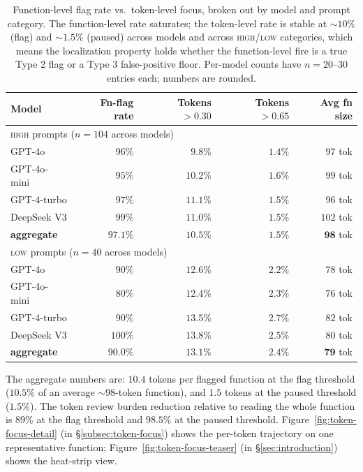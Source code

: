 \begin{table}[h]
\centering
\small
\begin{tabular}{l r r r r}
\toprule
\textbf{Model} & \textbf{Fn-flag rate} & \textbf{Tokens $>0.30$}
 & \textbf{Tokens $>0.65$} & \textbf{Avg fn size} \\
\midrule
\multicolumn{5}{l}{\textsc{high} prompts ($n=104$ across models)} \\
\midrule
GPT-4o        & $96\%$ & $9.8\%$  & $1.4\%$ & $97$ tok \\
GPT-4o-mini   & $95\%$ & $10.2\%$ & $1.6\%$ & $99$ tok \\
GPT-4-turbo   & $97\%$ & $11.1\%$ & $1.5\%$ & $96$ tok \\
DeepSeek V3   & $99\%$ & $11.0\%$ & $1.5\%$ & $102$ tok \\
\addlinespace
\textbf{aggregate} & $\mathbf{97.1\%}$ & $\mathbf{10.5\%}$
   & $\mathbf{1.5\%}$ & $\mathbf{98}$ tok \\
\midrule
\multicolumn{5}{l}{\textsc{low} prompts ($n=40$ across models)} \\
\midrule
GPT-4o        & $90\%$ & $12.6\%$ & $2.2\%$ & $78$ tok \\
GPT-4o-mini   & $80\%$ & $12.4\%$ & $2.3\%$ & $76$ tok \\
GPT-4-turbo   & $90\%$ & $13.5\%$ & $2.7\%$ & $82$ tok \\
DeepSeek V3   & $100\%$ & $13.8\%$ & $2.5\%$ & $80$ tok \\
\addlinespace
\textbf{aggregate} & $\mathbf{90.0\%}$ & $\mathbf{13.1\%}$
   & $\mathbf{2.4\%}$ & $\mathbf{79}$ tok \\
\bottomrule
\end{tabular}
\caption{Function-level flag rate vs.\ token-level focus, broken out
by model and prompt category. The function-level rate saturates; the
token-level rate is stable at $\sim 10\%$ (flag) and $\sim 1.5\%$
(paused) across models and across \textsc{high}/\textsc{low}
categories, which means the localization property holds whether the
function-level fire is a true Type 2 flag or a Type 3 false-positive
floor. Per-model counts have $n=20$--$30$ entries each; numbers are
rounded.}
\label{tab:token-focus-per-model}
\end{table}

The aggregate numbers are: $10.4$ tokens per flagged function at the
flag threshold ($10.5\%$ of an average $\sim 98$-token function), and
$1.5$ tokens at the paused threshold ($1.5\%$). The token review
burden reduction relative to reading the whole function is $89\%$ at
the flag threshold and $98.5\%$ at the paused threshold.
Figure~\ref{fig:token-focus-detail} (in \S\ref{subsec:token-focus})
shows the per-token trajectory on one representative function;
Figure~\ref{fig:token-focus-teaser} (in \S\ref{sec:introduction})
shows the heat-strip view.

